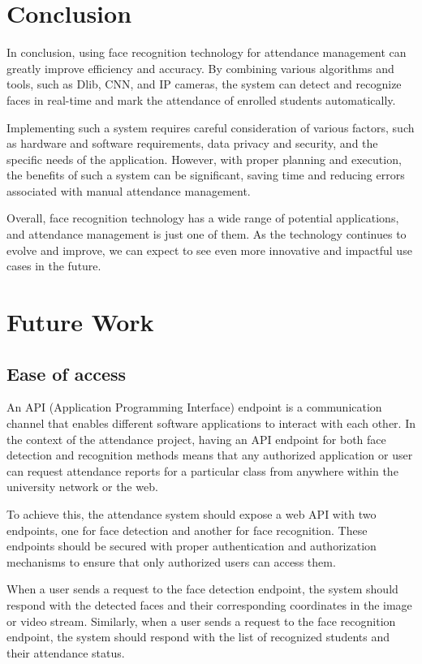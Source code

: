 \section{Conclusion}
In conclusion, using face recognition technology for attendance management can greatly improve efficiency and accuracy. By combining various algorithms and tools, such as Dlib, CNN, and IP cameras, the system can detect and recognize faces in real-time and mark the attendance of enrolled students automatically.

Implementing such a system requires careful consideration of various factors, such as hardware and software requirements, data privacy and security, and the specific needs of the application. However, with proper planning and execution, the benefits of such a system can be significant, saving time and reducing errors associated with manual attendance management.

Overall, face recognition technology has a wide range of potential applications, and attendance management is just one of them. As the technology continues to evolve and improve, we can expect to see even more innovative and impactful use cases in the future.
\clearpage
\section{Future Work}
\subsection{Ease of access}
An API (Application Programming Interface) endpoint is a communication channel that enables different software applications to interact with each other. In the context of the attendance project, having an API endpoint for both face detection and recognition methods means that any authorized application or user can request attendance reports for a particular class from anywhere within the university network or the web.

To achieve this, the attendance system should expose a web API with two endpoints, one for face detection and another for face recognition. These endpoints should be secured with proper authentication and authorization mechanisms to ensure that only authorized users can access them.

When a user sends a request to the face detection endpoint, the system should respond with the detected faces and their corresponding coordinates in the image or video stream. Similarly, when a user sends a request to the face recognition endpoint, the system should respond with the list of recognized students and their attendance status.

